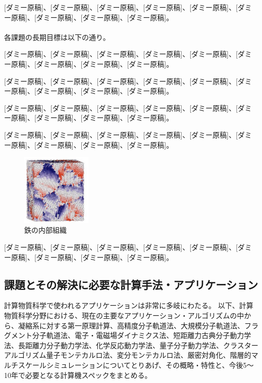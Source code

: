 [ダミー原稿]、[ダミー原稿]、[ダミー原稿]、[ダミー原稿]、[ダミー原稿]、[ダミー原稿]、[ダミー原稿]、[ダミー原稿]、[ダミー原稿]。

\paragraph{}
各課題の長期目標は以下の通り。

[ダミー原稿]、[ダミー原稿]、[ダミー原稿]、[ダミー原稿]、[ダミー原稿]、[ダミー原稿]、[ダミー原稿]、[ダミー原稿]、[ダミー原稿]。

[ダミー原稿]、[ダミー原稿]、[ダミー原稿]、[ダミー原稿]、[ダミー原稿]、[ダミー原稿]、[ダミー原稿]、[ダミー原稿]、[ダミー原稿]。

[ダミー原稿]、[ダミー原稿]、[ダミー原稿]、[ダミー原稿]、[ダミー原稿]、[ダミー原稿]、[ダミー原稿]、[ダミー原稿]、[ダミー原稿]。

[ダミー原稿]、[ダミー原稿]、[ダミー原稿]、[ダミー原稿]、[ダミー原稿]、[ダミー原稿]、[ダミー原稿]、[ダミー原稿]、[ダミー原稿]。
\begin{figure}[H]
  \centering
  \includegraphics[width=0.3\textwidth]{figs/4-2_1.pdf}
  \caption{鉄の内部組織}
  \label{fig:2-2_sample}
\end{figure}

[ダミー原稿]、[ダミー原稿]、[ダミー原稿]、[ダミー原稿]、[ダミー原稿]、[ダミー原稿]、[ダミー原稿]、[ダミー原稿]、[ダミー原稿]。


\subsection{課題とその解決に必要な計算手法・アプリケーション}
計算物質科学で使われるアプリケーションは非常に多岐にわたる。
以下、計算物質科学分野における、現在の主要なアプリケーション・アルゴリズムの中から、凝縮系に対する第一原理計算、高精度分子軌道法、大規模分子軌道法、フラグメント分子軌道法、電子・電磁場ダイナミクス法、短距離力古典分子動力学法、長距離力分子動力学法、化学反応動力学法、量子分子動力学法、クラスターアルゴリズム量子モンテカルロ法、変分モンテカルロ法、厳密対角化、階層的マルチスケールシミュレーションについてとりあげ、その概略・特性と、今後5～10年で必要となる計算機スペックをまとめる。


